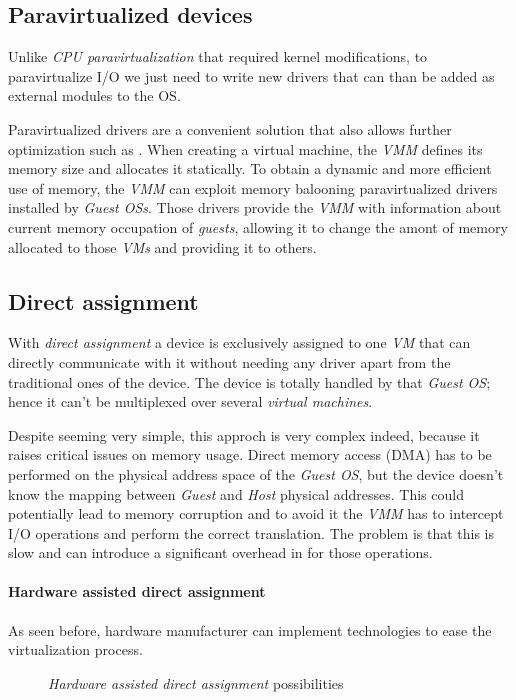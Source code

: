 \subsection{Paravirtualized devices}
Unlike \emph{CPU paravirtualization} that required kernel modifications, to
paravirtualize I/O we just need to write new drivers that can than be added as
external modules to the OS.

Paravirtualized drivers are a convenient solution that also allows further
optimization such as . When creating a virtual machine, the
\emph{VMM} defines its memory size and allocates it statically. To obtain a
dynamic and more efficient use of memory, the \emph{VMM} can exploit memory
balooning paravirtualized drivers installed by \emph{Guest OSs}. Those drivers
provide the \emph{VMM} with information about current memory occupation of
\emph{guests}, allowing it to change the amont of memory allocated to those
\emph{VMs} and providing it to others.

\subsection{Direct assignment}
With \emph{direct assignment} a device is exclusively assigned to one \emph{VM}
that can directly communicate with it without needing any driver apart from the
traditional ones of the device. The device is totally handled by that \emph{Guest
OS}; hence it can't be multiplexed over several \emph{virtual machines}.

Despite seeming very simple, this approch is very complex indeed, because it
raises critical issues on memory usage. Direct memory access (DMA) has to be
performed on the physical address space of the \emph{Guest OS}, but the device
doesn't know the mapping between \emph{Guest} and \emph{Host} physical addresses.
This could potentially lead to memory corruption and to avoid it the \emph{VMM}
has to intercept I/O operations and perform the correct translation. The
problem is that this is slow and can introduce a significant overhead in for
those operations.

\paragraph{Hardware assisted direct assignment}
As seen before, hardware manufacturer can implement technologies to ease the
virtualization process.

\begin{figure}[ht!]
    \centering
    \hspace{2cm}
    \caption{\emph{Hardware assisted direct assignment} possibilities}
\end{figure}

